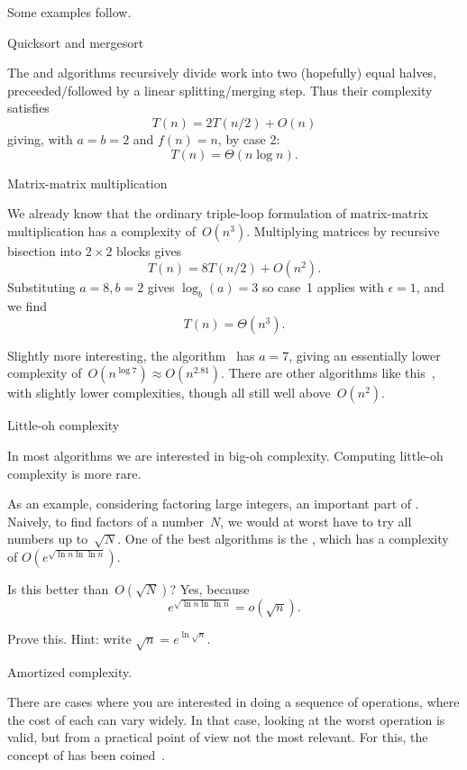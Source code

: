 Some examples follow.

 {Quicksort and mergesort}

The  and  algorithms
recursively divide work into two (hopefully) equal halves,
preceeded/followed by a linear splitting/merging step.
Thus their complexity satisfies
\[ T(n) = 2T(n/2) + O(n) \]
giving, with $a=b=2$ and $f(n)=n$, by case 2:
\[ T(n) = \Theta( n\log n ). \]

 {Matrix-matrix multiplication}

We already know that the ordinary triple-loop formulation of
matrix-matrix multiplication has a complexity of~$O(n^3)$.
Multiplying matrices by recursive bisection into $2\times 2$ blocks
gives
\[ T(n) = 8T(n/2) + O(n^2). \]
Substituting $a=8,b=2$ gives $\log_b(a)=3$
so case~1 applies with $\epsilon=1$,
and we find
\[ T(n) = \Theta( n^3 ). \]

Slightly more interesting, the
algorithm~\cite{St:gaussnotoptimal}
has $a=7$,
giving an essentially lower complexity of~$O(n^{\log 7}) \approx O(n^{2.81})$.
There are other algorithms like this~\cite{Pa:combinations},
with slightly lower complexities,
though all still well above~$O(n^2)$.

 {Little-oh complexity}

In most algorithms we are interested in big-oh complexity.
Computing little-oh complexity is more rare.

As an example, considering factoring large integers,
an important part of .
Naively, to find factors of a number~$N$,
we would at worst have to try all numbers up to~$\sqrt N$.
One of the best algorithms is the ,
which has a complexity of $O( e^{ \sqrt{ \ln n \ln \ln n } } )$.

Is this better than~$O(\sqrt N)$? Yes, because
\[ e^{ \sqrt{ \ln n \ln \ln n } } = o( \sqrt n ). \]
\begin{exercise}
  Prove this. Hint: write $\sqrt n=e^{\ln \sqrt n}$.
\end{exercise}

 {Amortized complexity}.

There are cases where you are interested in doing a sequence
of operations, where the cost of each can vary widely.
In that case, looking at the worst operation is valid,
but from a practical point of view not the most relevant.
For this, the concept of 
has been coined~\cite{Tarjan:amortized}.


